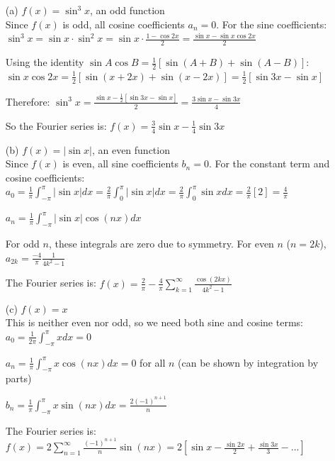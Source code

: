 \documentclass[english,onecolumn]{IEEEtran}
\begin{document}
\begin{itemize}
	\item[(a)] $f(x) = \sin^3x$, an odd function\\
	Since $f(x)$ is odd, all cosine coefficients $a_n = 0$. For the sine coefficients:\\

	$\sin^3 x = \sin x \cdot \sin^2 x = \sin x \cdot \frac{1-\cos 2x}{2} = \frac{\sin x - \sin x\cos 2x}{2}$

	Using the identity $\sin A \cos B = \frac{1}{2}[\sin(A+B) + \sin(A-B)]$: $\sin x\cos 2x = \frac{1}{2}[\sin(x+2x) + \sin(x-2x)] = \frac{1}{2}[\sin 3x - \sin x]$

	Therefore: $\sin^3 x = \frac{\sin x - \frac{1}{2}[\sin 3x - \sin x]}{2} = \frac{3\sin x - \sin 3x}{4}$

	So the Fourier series is: $f(x) = \frac{3}{4}\sin x - \frac{1}{4}\sin 3x$

	\item[(b)] $f(x) = |\sin x|$, an even function \\
	Since $f(x)$ is even, all sine coefficients $b_n = 0$. For the constant term and cosine coefficients:\\

	$a_0 = \frac{1}{\pi}\int_{-\pi}^{\pi}|\sin x|dx = \frac{2}{\pi}\int_{0}^{\pi}|\sin x|dx = \frac{2}{\pi}\int_{0}^{\pi}\sin x dx = \frac{2}{\pi}[2] = \frac{4}{\pi}$

	$a_n = \frac{1}{\pi}\int_{-\pi}^{\pi}|\sin x|\cos(nx)dx$

	For odd $n$, these integrals are zero due to symmetry. For even $n$ ($n = 2k$), $a_{2k} = \frac{-4}{\pi}\frac{1}{4k^2-1}$

	The Fourier series is: $f(x) = \frac{2}{\pi} - \frac{4}{\pi}\sum_{k=1}^{\infty}\frac{\cos(2kx)}{4k^2-1}$

	\item[(c)] $f(x) = x$\\
	This is neither even nor odd, so we need both sine and cosine terms:\\

	$a_0 = \frac{1}{2\pi}\int_{-\pi}^{\pi}x dx = 0$

	$a_n = \frac{1}{\pi}\int_{-\pi}^{\pi}x\cos(nx)dx = 0$ for all $n$ (can be shown by integration by parts)

	$b_n = \frac{1}{\pi}\int_{-\pi}^{\pi}x\sin(nx)dx = \frac{2(-1)^{n+1}}{n}$

	The Fourier series is: $f(x) = 2\sum_{n=1}^{\infty}\frac{(-1)^{n+1}}{n}\sin(nx) = 2[\sin x - \frac{\sin 2x}{2} + \frac{\sin 3x}{3} - ...]$


\end{itemize}
\end{document}
